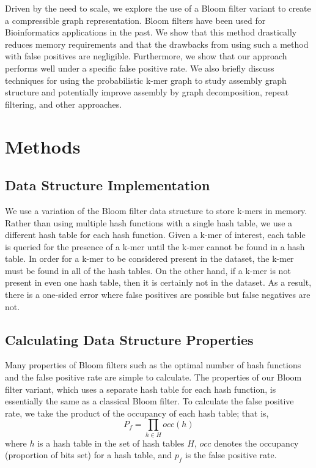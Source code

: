 \documentclass[12pt]{article} \usepackage{simplemargins}
\begin{document}
Driven by the need to scale, we explore the use of a 
Bloom filter variant to create a compressible graph 
representation. Bloom filters have been used for Bioinformatics applications 
in the past\cite{pmid20472541, haskell, pmid20426693}. We show that this method drastically
reduces memory requirements and that the drawbacks from using such a method 
with false positives are negligible. Furthermore, we show that our 
approach performs well under a specific false positive rate. We also 
briefly discuss techniques for using the probabilistic k-mer graph 
to study assembly graph structure and potentially improve assembly by 
graph decomposition, repeat filtering, and other approaches.

\section{Methods}

\subsection{Data Structure Implementation}
We use a variation of the Bloom filter data structure to store k-mers
in memory. Rather than using multiple hash functions with a single
hash table, we use a different hash table for each hash
function. Given a k-mer of interest, each table is queried for the
presence of a k-mer until the k-mer cannot be found in a hash
table. In order for a k-mer to be considered present in the dataset, 
the k-mer must be found in all of the hash tables. On the other hand, 
if a k-mer is not present in even one hash table, then it is certainly 
not in the dataset. As a result, there is a one-sided error where 
false positives are possible but false negatives are not.

\subsection{Calculating Data Structure Properties}
Many properties of Bloom filters such as the optimal number of hash functions 
and the false positive rate are simple to calculate. The properties 
of our Bloom filter variant, which 
uses a separate hash table for each hash function, is essentially the 
same as a classical Bloom filter. To calculate the false positive rate, we 
take the product of the occupancy of each hash table; that is,
\begin{displaymath}
P_f = \prod_{h \in H} occ(h)
\end{displaymath}
where $h$ is a hash table in the set of hash tables $H$, $occ$ denotes 
the occupancy (proportion of bits set) for a hash table, and $p_f$ is 
the false positive rate.
\end{document}
